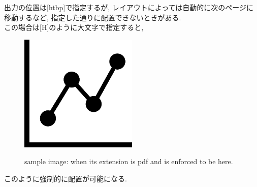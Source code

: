 \documentclass[/Users/ikedahajime/GitHub/reserch/master_report/thesis]{subfiles}
\begin{document}
    出力の位置は[htbp]で指定するが, レイアウトによっては自動的に次のページに移動するなど, 指定した通りに配置できないときがある.\\
    この場合は[H]のように大文字で指定すると,
    \begin{figure}[H]
        \centering
        \includegraphics[width=0.5\textwidth]{img/sample/sample_pdf.pdf}
        \label{Fig:sample_pdf_here}
        \caption[sample image (pdf, here)]{sample image: when its extension is pdf and is enforced to be here.}
    \end{figure}
    このように強制的に配置が可能になる.
\end{document}
